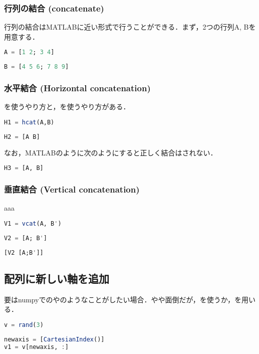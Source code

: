 \subsubsection{行列の結合 (concatenate)}
行列の結合はMATLABに近い形式で行うことができる．まず，2つの行列A, Bを用意する．
\begin{lstlisting}[language=julia]
A = [1 2; 3 4]
\end{lstlisting}
\begin{lstlisting}[language=julia]
B = [4 5 6; 7 8 9]
\end{lstlisting}
\subsubsection{水平結合 (Horizontal concatenation)}
を使うやり方と，\jl{[ ]}を使うやり方がある．
\begin{lstlisting}[language=julia]
H1 = hcat(A,B)
\end{lstlisting}
\begin{lstlisting}[language=julia]
H2 = [A B]
\end{lstlisting}
なお，MATLABのように次のようにすると正しく結合はされない．
\begin{lstlisting}[language=julia]
H3 = [A, B]
\end{lstlisting}
\subsubsection{垂直結合 (Vertical concatenation)}
aaa
\begin{lstlisting}[language=julia]
V1 = vcat(A, B')
\end{lstlisting}
\begin{lstlisting}[language=julia]
V2 = [A; B']
\end{lstlisting}
\begin{lstlisting}[language=julia]
[V2 [A;B']]
\end{lstlisting}
\subsection{配列に新しい軸を追加}
要はnumpyでのやのようなことがしたい場合．やや面倒だが，を使うか，\jl{[CartesianIndex()]}を用いる．
\begin{lstlisting}[language=julia]
v = rand(3)
\end{lstlisting}
\begin{lstlisting}[language=julia]
newaxis = [CartesianIndex()]
v1 = v[newaxis, :]
\end{lstlisting}
